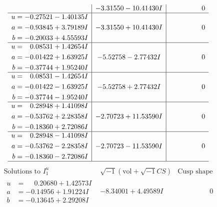 \documentclass[1p]{elsarticle_modified}
\theoremstyle{definition}
\newcommand{\I}{\sqrt{-1}}
\begin{document}
$$\begin{array}{c|c|c}
 & -3.31550 - 10.41430 I & \phantom{-0.000000 } 0 \\ \hline\begin{aligned}
u &= -0.27521 - 1.40135 I \\
a &= -0.93845 + 3.79189 I \\
b &= -0.20033 + 4.55593 I\end{aligned}
 & -3.31550 + 10.41430 I & \phantom{-0.000000 } 0 \\ \hline\begin{aligned}
u &= \phantom{-}0.08531 + 1.42654 I \\
a &= -0.01422 + 1.63925 I \\
b &= -0.37744 + 1.95240 I\end{aligned}
 & -5.52758 - 2.77432 I & \phantom{-0.000000 } 0 \\ \hline\begin{aligned}
u &= \phantom{-}0.08531 - 1.42654 I \\
a &= -0.01422 - 1.63925 I \\
b &= -0.37744 - 1.95240 I\end{aligned}
 & -5.52758 + 2.77432 I & \phantom{-0.000000 } 0 \\ \hline\begin{aligned}
u &= \phantom{-}0.28948 + 1.41098 I \\
a &= -0.53762 + 2.28358 I \\
b &= -0.18360 + 2.72086 I\end{aligned}
 & -2.70723 + 11.53590 I & \phantom{-0.000000 } 0 \\ \hline\begin{aligned}
u &= \phantom{-}0.28948 - 1.41098 I \\
a &= -0.53762 - 2.28358 I \\
b &= -0.18360 - 2.72086 I\end{aligned}
 & -2.70723 - 11.53590 I & \phantom{-0.000000 } 0\\
 \hline 
 \end{array}$$\newpage$$\begin{array}{c|c|c}  
\text{Solutions to }I^u_{1}& \I (\text{vol} + \sqrt{-1}CS) & \text{Cusp shape}\\
 \hline 
\begin{aligned}
u &= \phantom{-}0.20680 + 1.42573 I \\
a &= -0.14956 + 1.91224 I \\
b &= -0.13645 + 2.29208 I\end{aligned}
 & -8.34001 + 4.49589 I & \phantom{-0.000000 } 0 \\ \hline\begin{aligned}

\end{aligned}
\end{array}$$
\end{document}
